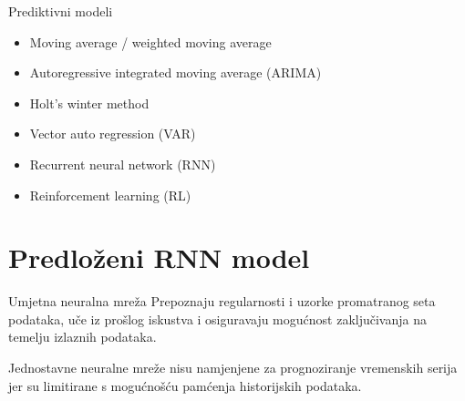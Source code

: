 \documentclass{beamer}
\begin{document}
  \begin{frame}{Prediktivni modeli}
    \begin{itemize}
      \item Moving average / weighted moving average
      \item Autoregressive integrated moving average (ARIMA)
      \item Holt's winter method
      \item Vector auto regression (VAR)
      \item \alert{Recurrent neural network (RNN)}
      \item Reinforcement learning (RL)
    \end{itemize}
  \end{frame}

  \section{Predloženi RNN model}
  \begin{frame}{Umjetna neuralna mreža}
    Prepoznaju regularnosti i uzorke promatranog seta podataka, uče iz prošlog iskustva i osiguravaju mogućnost zaključivanja na temelju izlaznih podataka.

    Jednostavne neuralne mreže nisu namjenjene za prognoziranje vremenskih serija jer su limitirane s mogućnošću pamćenja historijskih podataka.
  \end{frame}
\end{document}
